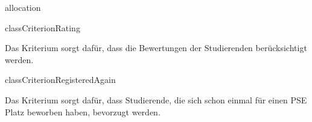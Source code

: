 \begin{texdocpackage}{allocation}
\begin{texdocclass}{class}{CriterionRating}
\label{texdoclet:allocation.CriterionRating}
\begin{texdocclassintro}
Das Kriterium sorgt dafür, dass die Bewertungen der Studierenden
 berücksichtigt werden.\end{texdocclassintro}
\begin{texdocclassconstructors}
\end{texdocclassconstructors}
\begin{texdocclassmethods}
\end{texdocclassmethods}
\end{texdocclass}


\begin{texdocclass}{class}{CriterionRegisteredAgain}
\label{texdoclet:allocation.CriterionRegisteredAgain}
\begin{texdocclassintro}
Das Kriterium sorgt dafür, dass Studierende, die sich schon einmal für einen
 PSE Platz beworben haben, bevorzugt werden.\end{texdocclassintro}
\begin{texdocclassconstructors}
\end{texdocclassconstructors}
\begin{texdocclassmethods}
\end{texdocclassmethods}
\end{texdocclass}



\end{texdocpackage}

